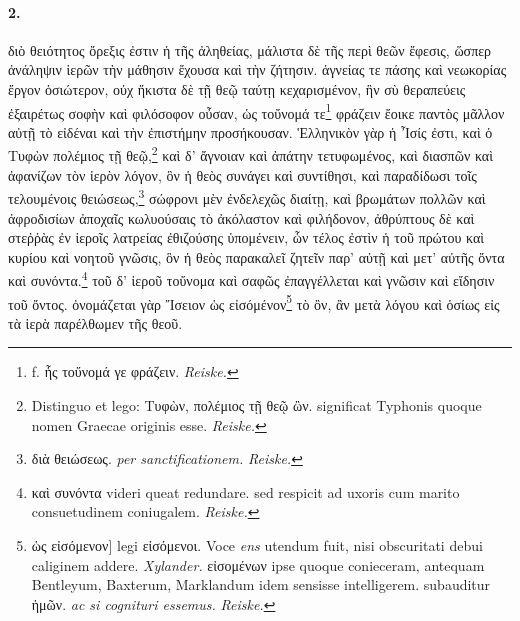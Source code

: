 \documentclass[a4paper, 11pt, oneside, polutonikogreek, german]{article}
\begin{document}
\paragraph{2.}
διὸ θειότητος ὄρεξις ἐστιν ἡ τῆς ἀληθείας, μάλιστα δὲ τῆς περὶ θεῶν ἔφεσις, ὥσπερ ἀνάληψιν ἱερῶν τὴν μάθησιν ἔχουσα καὶ τὴν ζήτησιν. ἁγνείας τε πάσης καὶ νεωκορίας ἔργον ὁσιώτερον, οὐχ ἥκιστα δὲ τῇ θεῷ ταύτῃ κεχαρισμένον, ἣν σὺ θεραπεύεις ἐξαιρέτως σοφὴν καὶ φιλόσοφον οὖσαν, ὡς τοὔνομά τε\footnote{f. ἧς τοὔνομά γε φράζειν. \emph{Reiske.}} φράζειν ἔοικε παντὸς μᾶλλον αὐτῇ τὸ εἰδέναι καὶ τὴν ἐπιστήμην προσήκουσαν. Ἑλληνικὸν γὰρ ἡ Ἶσίς ἐστι, καὶ ὁ Τυφὼν πολέμιος τῇ θεῷ,\footnote{Distinguo et lego: Τυφὼν, πολέμιος τῇ θεῷ ὢν. significat Typhonis quoque nomen Graecae originis esse. \emph{Reiske.}} καὶ δ' ἄγνοιαν καὶ ἀπάτην τετυφωμένος, καὶ διασπῶν καὶ ἀφανίζων τὸν ἱερὸν λόγον, ὃν ἡ θεὸς συνάγει καὶ συντίθησι, καὶ παραδίδωσι τοῖς τελουμένοις θειώσεως,\footnote{διὰ θειώσεως. \emph{per sanctificationem.} \emph{Reiske.}} σώφρονι μὲν ἐνδελεχῶς διαίτῃ, καὶ βρωμάτων πολλῶν καὶ ἀφροδισίων ἀποχαῖς κωλυούσαις τὸ ἀκόλαστον καὶ φιλήδονον, ἀθρύπτους δὲ καὶ στεῤῥὰς ἐν ἱεροῖς λατρείας ἐθιζούσης ὑπομένειν, ὧν τέλος ἐστὶν ἡ τοῦ πρώτου καὶ κυρίου καὶ νοητοῦ γνῶσις, ὃν ἡ θεὸς παρακαλεῖ ζητεῖν παρ' αὐτῇ καὶ μετ' αὐτῆς ὄντα καὶ συνόντα.\footnote{καὶ συνόντα videri queat redundare. sed respicit ad uxoris cum marito consuetudinem coniugalem. \emph{Reiske.}} τοῦ δ' ἱεροῦ τοὔνομα καὶ σαφῶς ἐπαγγέλλεται καὶ γνῶσιν καὶ εἴδησιν τοῦ ὄντος. ὀνομάζεται γὰρ Ἴσειον ὡς εἰσόμένον\footnote{ὡς εἰσόμενον] legi εἰσόμενοι. Voce \emph{ens} utendum fuit, nisi obscuritati debui caliginem addere. \emph{Xylander.} εἰσομένων ipse quoque conieceram, antequam Bentleyum, Baxterum, Marklandum idem sensisse intelligerem. subauditur ἡμῶν. \emph{ac si cognituri essemus.} \emph{Reiske.}} τὸ ὂν, ἂν μετὰ λόγου καὶ ὁσίως εἰς τὰ ἱερὰ παρέλθωμεν τῆς θεοῦ.
\end{document}
